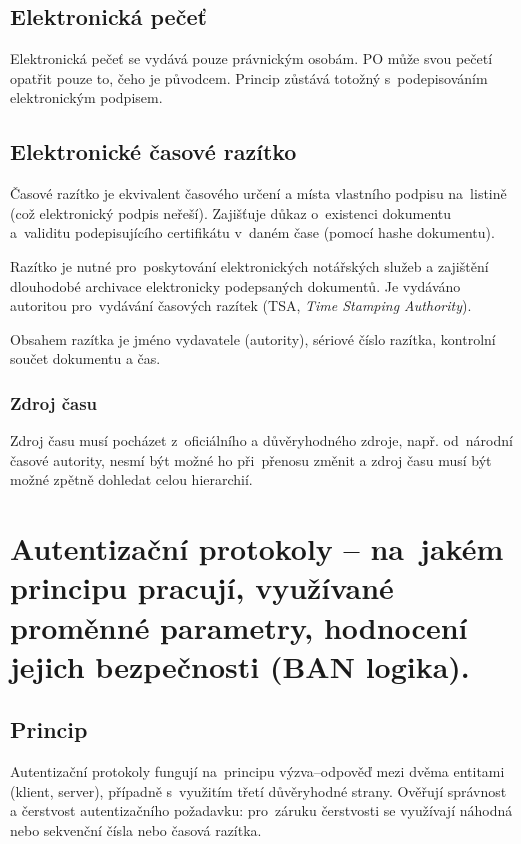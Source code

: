 \subsection{Elektronická pečeť}

Elektronická pečeť se vydává pouze právnickým osobám.
PO může svou pečetí opatřit pouze to, čeho je původcem.
Princip zůstává totožný s~podepisováním elektronickým podpisem.


\subsection{Elektronické časové razítko}

Časové razítko je ekvivalent časového určení a místa vlastního podpisu na~listině (což elektronický podpis neřeší).
Zajišťuje důkaz o~existenci dokumentu a~validitu podepisujícího certifikátu v~daném čase (pomocí hashe dokumentu).

Razítko je nutné pro~poskytování elektronických notářských služeb a zajištění dlouhodobé archivace elektronicky podepsaných dokumentů.
Je vydáváno autoritou pro~vydávání časových razítek (TSA, \emph{Time Stamping Authority}).

Obsahem razítka je jméno vydavatele (autority), sériové číslo razítka, kontrolní součet dokumentu a čas.

\subsubsection{Zdroj času}

Zdroj času musí pocházet z~oficiálního a důvěryhodného zdroje, např. od~národní časové autority, nesmí být možné ho při~přenosu změnit a zdroj času musí být možné zpětně dohledat celou hierarchií.


\clearpage
\section{Autentizační protokoly -- na~jakém principu pracují, využívané proměnné parametry, hodnocení jejich bezpečnosti (BAN logika).}

\subsection{Princip}

Autentizační protokoly fungují na~principu výzva--odpověď mezi dvěma entitami (klient, server), případně s~využitím třetí důvěryhodné strany.
Ověřují správnost a čerstvost autentizačního požadavku: pro~záruku čerstvosti se využívají náhodná nebo sekvenční čísla nebo časová razítka.


